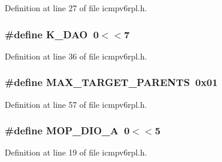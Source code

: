 Definition at line 27 of file icmpv6rpl.\+h.

\subsubsection[{\texorpdfstring{K\+\_\+\+D\+AO}{K_DAO}}]{\setlength{\rightskip}{0pt plus 5cm}\#define K\+\_\+\+D\+AO~0$<$$<$7}\hypertarget{group___i_c_m_pv6_r_p_l_gae04d97823b9a09639485cd885dfc6854}{}\label{group___i_c_m_pv6_r_p_l_gae04d97823b9a09639485cd885dfc6854}


Definition at line 36 of file icmpv6rpl.\+h.

\subsubsection[{\texorpdfstring{M\+A\+X\+\_\+\+T\+A\+R\+G\+E\+T\+\_\+\+P\+A\+R\+E\+N\+TS}{MAX_TARGET_PARENTS}}]{\setlength{\rightskip}{0pt plus 5cm}\#define M\+A\+X\+\_\+\+T\+A\+R\+G\+E\+T\+\_\+\+P\+A\+R\+E\+N\+TS~0x01}\hypertarget{group___i_c_m_pv6_r_p_l_ga2f6d170fd016021a724a8730292e6c37}{}\label{group___i_c_m_pv6_r_p_l_ga2f6d170fd016021a724a8730292e6c37}


Definition at line 57 of file icmpv6rpl.\+h.

\subsubsection[{\texorpdfstring{M\+O\+P\+\_\+\+D\+I\+O\+\_\+A}{MOP_DIO_A}}]{\setlength{\rightskip}{0pt plus 5cm}\#define M\+O\+P\+\_\+\+D\+I\+O\+\_\+A~0$<$$<$5}\hypertarget{group___i_c_m_pv6_r_p_l_ga1ae12caee968b3c4346355e6edc2fa1b}{}\label{group___i_c_m_pv6_r_p_l_ga1ae12caee968b3c4346355e6edc2fa1b}


Definition at line 19 of file icmpv6rpl.\+h.

